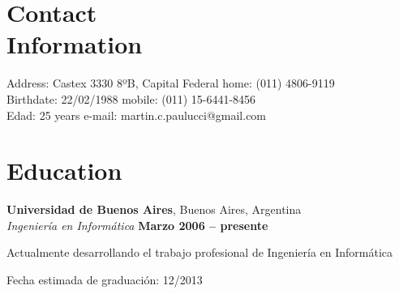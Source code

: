 \documentclass[margin,line]{resume}
\begin{document}
\begin{resume}

    \section{\mysidestyle Contact\\Information}

    Address: Castex 3330 8ºB, Capital Federal                            \hfill home: (011) 4806-9119         \vspace{0mm}\\\vspace{0mm}%
    Birthdate: 22/02/1988                          \hfill mobile: (011) 15-6441-8456         \vspace{0mm}\\\vspace{0mm}%
    Edad: 25 years      \hfill e-mail: martin.c.paulucci@gmail.com  \vspace{0mm}\\\vspace{-4.5mm}%

    \section{\mysidestyle Education}

    \textbf{Universidad de Buenos Aires}, Buenos Aires, Argentina \vspace{2mm}\\\vspace{1mm}%
    \textsl{Ingeniería en Informática} \hfill \textbf{ Marzo 2006 -- presente}\vspace{-3mm}\\\vspace{-1mm}%
    \begin{list2}
        \item Actualmente desarrollando el trabajo profesional de Ingeniería en Informática
        \item Fecha estimada de graduación: 12/2013
    \end{list2}\vspace{-1.5mm}


\end{resume}
\end{document}

